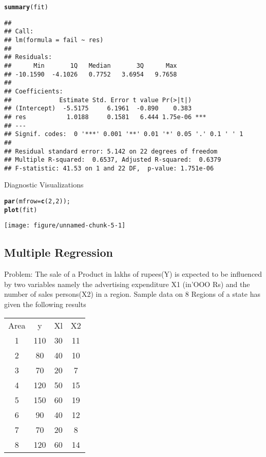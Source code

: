 \documentclass{article}\usepackage[]{graphicx}\usepackage[]{xcolor}
\makeatletter
\def\maxwidth{ %
  \ifdim\Gin@nat@width>\linewidth
    \linewidth
  \else
    \Gin@nat@width
  \fi
}
\newcommand{\hlnum}[1]{\textcolor[rgb]{0.686,0.059,0.569}{#1}}%
\newcommand{\hldef}[1]{\textcolor[rgb]{0.345,0.345,0.345}{#1}}%
\newcommand{\hlkwc}[1]{\textcolor[rgb]{0.333,0.667,0.333}{#1}}%
\newcommand{\hlkwd}[1]{\textcolor[rgb]{0.737,0.353,0.396}{\textbf{#1}}}%
\newenvironment{kframe}{%
 \def\at@end@of@kframe{}%
 \ifinner\ifhmode%
  \def\at@end@of@kframe{\end{minipage}}%
  \begin{minipage}{\columnwidth}%
 \fi\fi%
 \def\FrameCommand##1{\hskip\@totalleftmargin \hskip-\fboxsep
 \colorbox{shadecolor}{##1}\hskip-\fboxsep
     \hskip-\linewidth \hskip-\@totalleftmargin \hskip\columnwidth}%
 \MakeFramed {\advance\hsize-\width
   \@totalleftmargin\z@ \linewidth\hsize
   \@setminipage}}%
 {\par\unskip\endMakeFramed%
 \at@end@of@kframe}
\newenvironment{knitrout}{}{} %
\makeatother
\begin{document}
\begin{knitrout}
\color{fgcolor}\begin{kframe}
\begin{alltt}
\hlkwd{summary}\hldef{(fit)}
\end{alltt}
\begin{verbatim}
## 
## Call:
## lm(formula = fail ~ res)
## 
## Residuals:
##      Min       1Q   Median       3Q      Max 
## -10.1590  -4.1026   0.7752   3.6954   9.7658 
## 
## Coefficients:
##             Estimate Std. Error t value Pr(>|t|)    
## (Intercept)  -5.5175     6.1961  -0.890    0.383    
## res           1.0188     0.1581   6.444 1.75e-06 ***
## ---
## Signif. codes:  0 '***' 0.001 '**' 0.01 '*' 0.05 '.' 0.1 ' ' 1
## 
## Residual standard error: 5.142 on 22 degrees of freedom
## Multiple R-squared:  0.6537,	Adjusted R-squared:  0.6379 
## F-statistic: 41.53 on 1 and 22 DF,  p-value: 1.751e-06
\end{verbatim}
\end{kframe}
\end{knitrout}
Diagnostic Visualizations
\begin{knitrout}
\color{fgcolor}\begin{kframe}
\begin{alltt}
\hlkwd{par}\hldef{(}\hlkwc{mfrow}\hldef{=}\hlkwd{c}\hldef{(}\hlnum{2}\hldef{,}\hlnum{2}\hldef{));}
\hlkwd{plot}\hldef{(fit)}
\end{alltt}
\end{kframe}
\texttt{[image: figure/unnamed-chunk-5-1]} 
\end{knitrout}
\subsection{Multiple Regression}
Problem: \newline
The sale of a Product in lakhs of rupees(Y) is expected to be influenced by two variables namely the advertising expenditure X1 (in’OOO Rs) and the number of sales persons(X2) in a region. Sample data on 8 Regions of a state has given the following results

\begin{table}[]
\begin{tabular}{cccc}
Area & y   & Xl & X2 \\
1    & 110 & 30 & 11 \\
2    & 80  & 40 & 10 \\
3    & 70  & 20 & 7  \\
4    & 120 & 50 & 15 \\
5    & 150 & 60 & 19 \\
6    & 90  & 40 & 12 \\
7    & 70  & 20 & 8  \\
8    & 120 & 60 & 14
\end{tabular}
\end{table}
\end{document}

